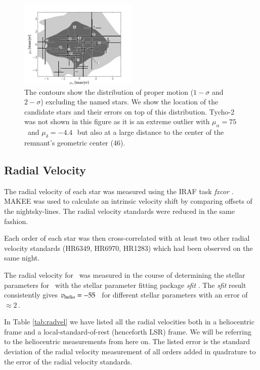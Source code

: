 \begin{figure}[htbp] %
   \centering
   \includegraphics[width=0.5\textwidth]{chapter_sn1572_hires/plots/propmot_distr.pdf}
   \caption{The contours show the distribution of proper motion ($1-\sigma$ and $2-\sigma$) excluding the named stars.
    We show the location of the candidate stars and their errors on top of this distribution. Tycho-2 was not shown in this figure as it is an extreme outlier with $\mu_\alpha=75$\,\masyr\ and $\mu_\delta=-4.4$\,\masyr\ but also at a large distance to the center of the remnant's geometric center (46\arcsec).}
   \label{fig:propmot}
\end{figure}


\subsection{Radial Velocity}
\label{sec:radvel}

The radial velocity of each star was measured using the IRAF task \textit{fxcor} \citep{1979AJ.....84.1511T}. MAKEE was used to calculate an intrinsic velocity shift by comparing offsets of the nightsky-lines. The radial velocity standards were reduced in the same fashion. 
 
Each order of each star was then cross-correlated with at least two other radial velocity standards (HR6349, HR6970, HR1283) which had been observed on the same night.


The radial velocity for \starb\ was measured in the course of determining the stellar parameters for \starb\ with the stellar parameter fitting package \textit{sfit} \citesfit. The \textit{sfit} result consistently gives $v_{\textnormal{helio}} = -55$ \kms\ for different stellar parameters with an error of $\approx 2$\,\kms. 


In Table \ref{tab:radvel} we have listed all the radial velocities both in a heliocentric frame and a local-standard-of-rest (henceforth LSR) frame. We will be referring to the heliocentric measurements from here on. The listed error is the standard deviation of the radial velocity measurement of all orders added in quadrature to the error of the radial velocity standards.

